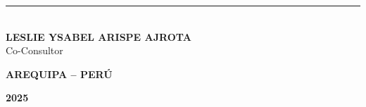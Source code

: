 \begin{titlepage}
    \vspace{1.5cm}

    \hfill
    \begin{minipage}{0.45\textwidth}
        \centering
        \rule{6cm}{0.5pt}\\
        \vspace{0.2cm}
        \textbf{LESLIE YSABEL ARISPE AJROTA}\\
        \small Co-Consultor
    \end{minipage}
    \hfill

    \vfill
    
    {\large \textbf{AREQUIPA -- PERÚ}\par}
    {\large \textbf{2025}\par}
    \vspace{0.3cm}

\end{titlepage}

